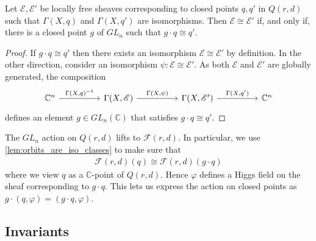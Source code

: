 \documentclass[12pt]{ociamthesis}  %
\begin{document}
\begin{lemma}\label{lem:orbits_are_iso_classes}
  Let $\mathscr E,\mathscr E'$ be locally free sheaves corresponding
  to closed points $q,q'$ in $Q(r,d)$ such that
  $\Gamma(X,q)$ and $\Gamma(X,q')$ are isomorphisms.
  Then $\mathscr E\cong\mathscr E'$
  if, and only if, there is a closed point $g$ of $GL_n$
  such that $g\cdot q \cong q'$.
  \begin{proof}
    If $g\cdot q \cong q'$ then there exists an isomorphism
    $\mathscr E\cong\mathscr E'$ by definition. In the other direction,
    consider an isomorphism $\psi:\mathscr E\cong\mathscr E'$.
    As both $\mathscr E$ and $\mathscr E'$ are globally generated,
    the composition
    \begin{equation*}
      \begin{tikzcd}
        {\mathbb C^n} && {\Gamma(X,\mathscr E)} && {\Gamma(X,\mathscr E')} && {\mathbb C^n}
        \arrow["{\Gamma(X,q)^{-1}}", from=1-1, to=1-3]
        \arrow["{\Gamma(X,\psi)}", from=1-3, to=1-5]
        \arrow["{\Gamma(X,q')}", from=1-5, to=1-7]
      \end{tikzcd}
    \end{equation*}
    defines an element $g\in GL_n(\mathbb C)$ that satisfies
    $g\cdot q \cong q'$.
  \end{proof}
\end{lemma}

\begin{example}
  The $GL_n$ action on $Q(r,d)$ lifts to $\mathcal F(r,d)$.
  In particular, we use \ref{lem:orbits_are_iso_classes} to make sure
  that
  \begin{align*}
    \mathcal F(r,d)(q) \cong \mathcal F(r,d)(g\cdot q)
  \end{align*}
  where we view $q$ as a $\mathbb C$-point of $Q(r,d)$. Hence
  $\varphi$ defines a Higgs field on the sheaf corresponding to
  $g\cdot q$. This lets us express the action on closed points
  as $g\cdot(q,\varphi) = (g\cdot q,\varphi)$.
\end{example}

\begin{definition}
\end{definition}


\subsection{Invariants}
\end{document}
